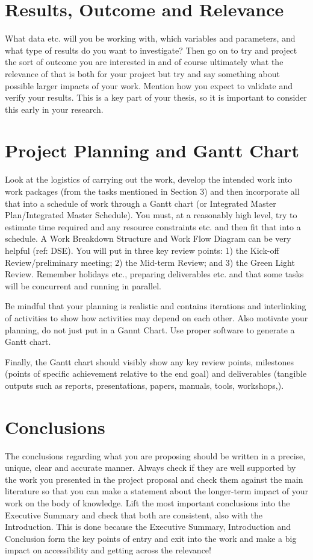 \documentclass[12pt, english, NoHyper]{AE4010-template}
\begin{document}
\section{Results, Outcome and Relevance}
What data etc. will you be working with, which variables and parameters, and what type of results do you want to investigate? Then go on to try and project the sort of outcome you are interested in and of course ultimately what the relevance of that is both for your project but try and say something about possible larger impacts of your work. Mention how you expect to validate and verify your results. This is a key part of your thesis, so it is important to consider this early in your research.





\section{Project Planning and Gantt Chart}
Look at the logistics of carrying out the work, develop the intended work into work packages (from the tasks mentioned in Section 3) and then incorporate all that into a schedule of work through a Gantt chart (or Integrated Master Plan/Integrated Master Schedule). You must, at a reasonably high level, try to estimate time required and any resource constraints etc. and then fit that into a schedule. A Work Breakdown Structure and Work Flow Diagram can be very helpful (ref: DSE). You will put in three key review points: 1) the Kick-off Review/preliminary meeting; 2) the Mid-term Review; and 3) the Green Light Review. Remember holidays etc., preparing deliverables etc. and that some tasks will be concurrent and running in parallel. 

Be mindful that your planning is realistic and contains iterations and interlinking of activities to show how activities may depend on each other. Also motivate your planning, do not just put in a Gannt Chart. Use proper software to generate a Gantt chart.

\noindent Finally, the Gantt chart should visibly show any key review points, milestones (points of specific achievement relative to the end goal) and deliverables (tangible outputs such as reports, presentations, papers, manuals, tools, workshops,).






\section{Conclusions}
The conclusions regarding what you are proposing should be written in a precise, unique, clear and accurate manner. Always check if they are well supported by the work you presented in the project proposal and check them against the main literature so that you can make a statement about the longer-term impact of your work on the body of knowledge. Lift the most important conclusions into the Executive Summary and check that both are consistent, also with the Introduction. This is done because the Executive Summary, Introduction and Conclusion form the key points of entry and exit into the work and make a big impact on accessibility and getting across the relevance!
\end{document}
